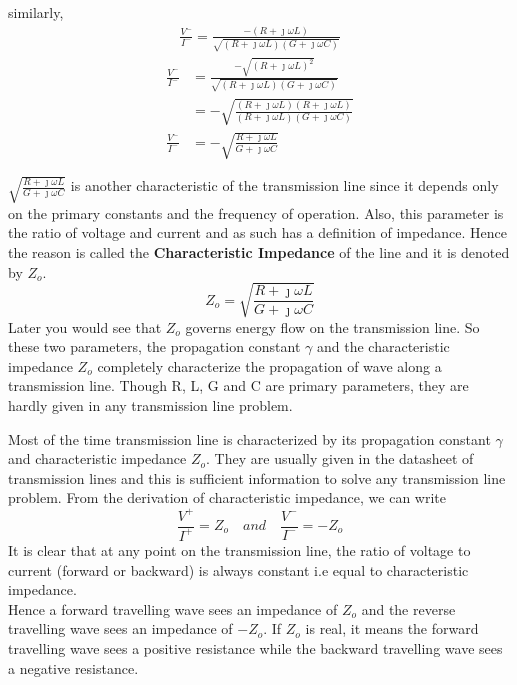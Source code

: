 similarly,
\begin{align*}
\frac{V^-}{I^-} = \frac{-(R+\jmath\omega L)}{\sqrt{(R + \jmath\omega L)(G + \jmath\omega C)}}
\end{align*}
\begin{align*}
\frac{V^-}{I^-} &= \frac{-\sqrt{(R+\jmath\omega L)^2}}{\sqrt{(R + \jmath\omega L)(G + \jmath\omega C)}}\\
&=-\sqrt{\frac{(R+\jmath\omega L)(R+\jmath\omega L)}{(R + \jmath\omega L)(G + \jmath\omega C)}}\\
\frac{V^-}{I^-} &=-\sqrt{\frac{R+\jmath\omega L}{G+\jmath\omega C}}
\end{align*}

$\sqrt{\frac{R+\jmath\omega L}{G+\jmath\omega C}}$ is another characteristic of the transmission line since it depends only on the primary constants and the frequency of operation. Also, this parameter is the ratio of voltage and current and as such has a definition of impedance. Hence the reason is called the \textbf{Characteristic Impedance} of the line and it is denoted by $Z_o$.
\begin{equation}
Z_o = \sqrt{\frac{R+\jmath\omega L}{G+\jmath\omega C}}
\end{equation}
Later you would see that $Z_o$ governs energy flow on the transmission line. So these two parameters, the propagation constant $\gamma$ and the characteristic impedance $Z_o$ completely characterize the propagation of wave along a transmission line. Though R, L, G and C are primary parameters, they are hardly given in any transmission line problem. 

Most of the time transmission line is characterized by its propagation constant $\gamma$ and characteristic impedance $Z_o$. They are usually given in the datasheet of transmission lines and this is sufficient information to solve any transmission line problem.
From the derivation of characteristic impedance, we can write
\begin{equation}
\frac{V^+}{I^+} = Z_o\quad and\quad \frac{V^-}{I^-} = -Z_o
\end{equation}
It is clear that at any point on the transmission line, the ratio of voltage to current (forward or backward) is always constant i.e equal to characteristic impedance.\\

Hence a forward travelling wave sees an impedance of $Z_o$ and the reverse travelling wave sees an impedance of $-Z_o$. If $Z_o$ is real, it means the forward travelling wave sees a positive resistance while the backward travelling wave sees a negative resistance.

